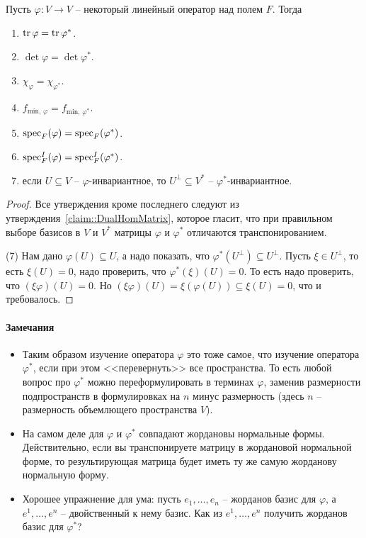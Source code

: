 \begin{claim}
Пусть $\varphi\colon V\to V$ -- некоторый линейный оператор над полем $F$.
Тогда
\begin{enumerate}
\item $\operatorname{tr} \varphi = \operatorname{tr} \varphi^*$.

\item $\det \varphi = \det \varphi^*$.

\item $\chi_\varphi = \chi_{\varphi^*}$.

\item $f_{\text{min},\,\varphi} = f_{\text{min},\,\varphi^*}$.

\item $\operatorname{spec}_F(\varphi) = \operatorname{spec}_F(\varphi^*)$.

\item $\operatorname{spec}_F^I(\varphi) = \operatorname{spec}_F^I(\varphi^*)$.

\item если $U\subseteq V$ -- $\varphi$-инвариантное, то $U^\bot\subseteq V^*$ -- $\varphi^*$-инвариантное.
\end{enumerate}
\end{claim}
\begin{proof}
Все утверждения кроме последнего следуют из утверждения~\ref{claim::DualHomMatrix}, которое гласит, что при правильном выборе базисов в $V$ и $V^*$ матрицы $\varphi$ и $\varphi^*$ отличаются транспонированием.

(7) Нам дано $\varphi(U)\subseteq U$, а надо показать, что $\varphi^*(U^\bot)\subseteq U^\bot$.
Пусть $\xi\in U^\bot$, то есть $\xi(U) = 0$, надо проверить, что $\varphi^*(\xi)(U) = 0$.
То есть надо проверить, что $(\xi \varphi)(U) = 0$.
Но $(\xi \varphi) (U) = \xi(\varphi(U))\subseteq \xi(U) = 0$, что и требовалось.
\end{proof}

\paragraph{Замечания}

\begin{itemize}
\item Таким образом изучение оператора $\varphi$ это тоже самое, что изучение оператора $\varphi^*$, если при этом <<перевернуть>> все пространства.
То есть любой вопрос про $\varphi^*$ можно переформулировать в терминах $\varphi$, заменив размерности подпространств в формулировках на $n$ минус размерность (здесь $n$ -- размерность объемлющего пространства $V$).

\item На самом деле для $\varphi$ и $\varphi^*$ совпадают жордановы нормальные формы.
Действительно, если вы транспонируете матрицу в жордановой нормальной форме, то результирующая матрица будет иметь ту же самую жорданову нормальную форму.

\item Хорошее упражнение для ума: пусть $e_1,\ldots,e_n$ -- жорданов базис для $\varphi$, а $e^1,\ldots,e^n$ -- двойственный к нему базис.
Как из $e^1,\ldots,e^n$ получить жорданов базис для $\varphi^*$?
\end{itemize}

